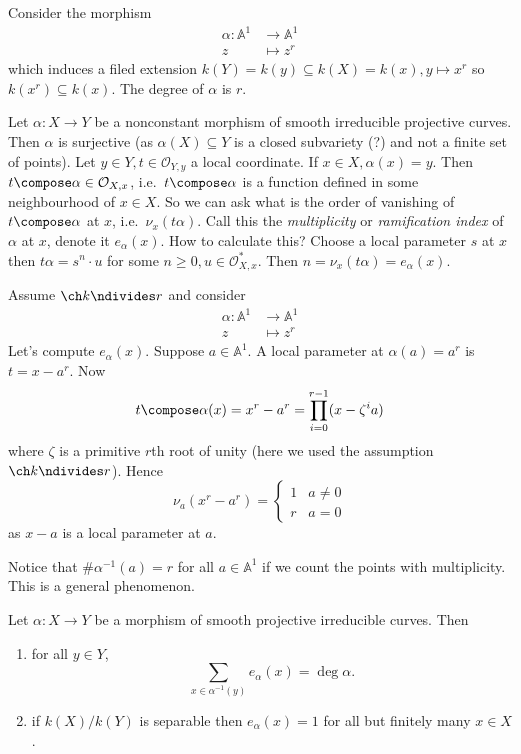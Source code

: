 \documentclass[a4paper]{article}
\renewcommand{\A}{\mathbb{A}}
\begin{document}
\begin{eg}
  Consider the morphism
  \begin{align*}
    \alpha: \A^1 &\to \A^1 \\
    z &\mapsto z^r
  \end{align*}
  which induces a filed extension \(k(Y) = k(y) \subseteq k(X) = k(x), y \mapsto x^r\) so \(k(x^r) \subseteq k(x)\). The degree of \(\alpha\) is \(r\).
\end{eg}

Let \(\alpha: X \to Y\) be a nonconstant morphism of smooth irreducible projective curves. Then \(\alpha\) is surjective (as \(\alpha(X) \subseteq Y\) is a closed subvariety (?) and not a finite set of points). Let \(y \in Y, t \in \mathcal O_{Y, y}\) a local coordinate. If \(x \in X, \alpha(x) = y\). Then \(t \compose \alpha \in \mathcal O_{X, x}\), i.e.\ \(t \compose \alpha\) is a function defined in some neighbourhood of \(x \in X\). So we can ask what is the order of vanishing of \(t \compose \alpha\) at \(x\), i.e.\ \(\nu_x(t\alpha)\). Call this the \emph{multiplicity} or \emph{ramification index} of \(\alpha\) at \(x\), denote it \(e_\alpha(x)\). How to calculate this? Choose a local parameter \(s\) at \(x\) then \(t\alpha = s^n \cdot u\) for some \(n \geq 0, u \in \mathcal O_{X, x}^*\). Then \(n = \nu_x(t\alpha) = e_\alpha(x)\).

\begin{eg}
  Assume \(\ch k \ndivides r\) and consider
  \begin{align*}
    \alpha: \A^1 &\to \A^1 \\
    z &\mapsto z^r
  \end{align*}
  Let's compute \(e_\alpha(x)\). Suppose \(a \in \A^1\). A local parameter at \(\alpha(a) = a^r\) is \(t = x - a^r\). Now
  \[
    t \compose \alpha(x) = x^r - a ^r = \prod_{i = 0}^{r - 1} (x - \zeta^ia)
  \]
  where \(\zeta\) is a primitive \(r\)th root of unity (here we used the assumption \(\ch k \ndivides r\)). Hence
  \[
    \nu_a (x^r - a^r) =
    \begin{cases}
      1 & a \neq 0 \\
      r & a = 0
    \end{cases}
  \]
  as \(x - a\) is a local parameter at \(a\).

  Notice that \(\# \alpha^{-1}(a) = r\) for all \(a \in \A^1\) if we count the points with multiplicity. This is a general phenomenon.
\end{eg}

\begin{theorem}
  Let \(\alpha: X \to Y\) be a morphism of smooth projective irreducible curves. Then
  \begin{enumerate}
  \item for all \(y \in Y\),
    \[
      \sum_{x \in \alpha^{-1}(y)} e_\alpha(x) = \deg \alpha.
    \]
  \item if \(k(X)/k(Y)\) is separable then \(e_\alpha(x) = 1\) for all but finitely many \(x \in X\).
  \end{enumerate}
\end{theorem}
\end{document}
